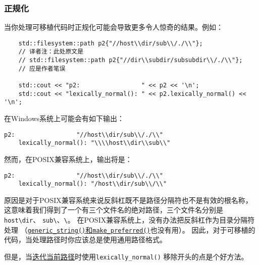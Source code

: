 \subsubsection{正规化}
当你处理可移植代码时正规化可能会导致更多令人惊奇的结果。例如：
\begin{lstlisting}
    std::filesystem::path p2{"//host\\dir/sub\\/./\\"};
    // 译者注：此处原文是
    // std::filesystem::path p2{"//dir\\subdir/subsubdir\\/./\\"};
    // 应是作者笔误

    std::cout << "p2:                 " << p2 << '\n';
    std::cout << "lexically_normal(): " << p2.lexically_normal() << '\n';
\end{lstlisting}
在Windows系统上可能会有如下输出：
\begin{lstlisting}[stringstyle=\color{black}]
    p2:                 "//host\\dir/sub\\/./\\"
    lexically_normal(): "\\\\host\\dir\\sub\\"
\end{lstlisting}
然而，在POSIX兼容系统上，输出将是：
\begin{lstlisting}[stringstyle=\color{black}]
    p2:                 "//host\\dir/sub\\/./\\"
    lexically_normal(): "/host\\dir/sub\\/\\"
\end{lstlisting}
原因是对于POSIX兼容系统来说反斜杠既不是路径分隔符也不是有效的根名称，
这意味着我们得到了一个有三个文件名的绝对路径，三个文件名分别是\texttt{host\textbackslash dir}、
\texttt{sub\textbackslash}、\texttt{\textbackslash}。
在POSIX兼容系统上，没有办法把反斜杠作为目录分隔符处理
（\hyperref[ch20.3.4]{\texttt{generic\_string()}和\texttt{make\_preferred()}}也没有用）。
因此，对于可移植的代码，当处理路径时你应该总是使用通用路径格式。

但是，当\hyperref[迭代.]{迭代当前路径}时使用\texttt{lexically\_normal()}
移除开头的点是个好方法。

